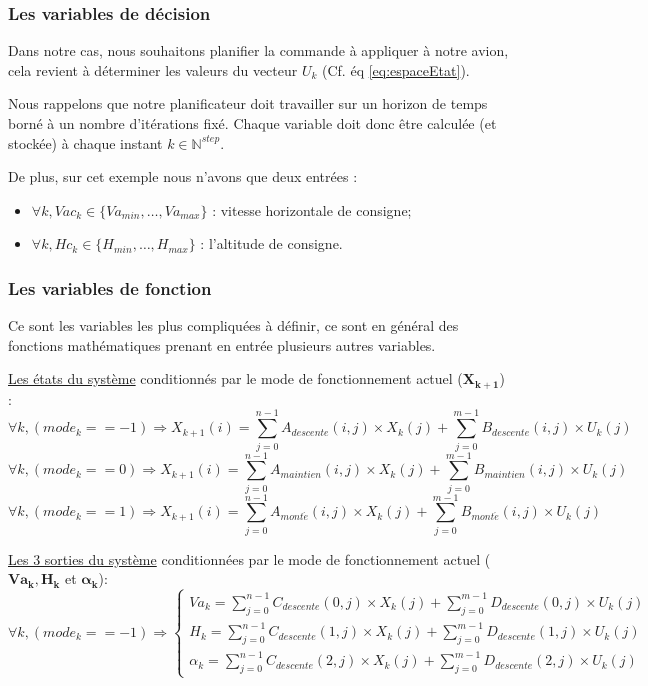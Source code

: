 \subsubsection{Les variables de décision}
\label{variableDecision}
Dans notre cas, nous souhaitons planifier la commande à appliquer à notre avion, cela revient à déterminer les valeurs du vecteur $U_k$ (Cf. éq \ref{eq:espaceEtat}). 


Nous rappelons que notre planificateur doit travailler sur un horizon de temps borné à un nombre d'itérations fixé. Chaque variable doit donc être calculée (et stockée) à chaque instant $k \in \mathbb{N}^{step}$.

De plus, sur cet exemple nous n'avons que deux entrées :
\begin{itemize}	
	\item $\forall k, Vac_{k} \in \{Va_{min}, \ldots, Va_{max}\}$ : vitesse horizontale de consigne;	
	\item $\forall k, Hc_{k} \in \{H_{min}, \ldots, H_{max}\}$ : l'altitude de consigne.	
\end{itemize}

\subsubsection{Les variables de fonction}
\label{variableFonction}
Ce sont les variables les plus compliquées à définir, ce sont en général des fonctions mathématiques prenant en entrée plusieurs autres variables.

\underline{Les états du système} conditionnés par le mode de fonctionnement actuel ({$\mathbf{X_{k+1}}$}) :\\
\[\forall k, (mode_k == -1) \Rightarrow X_{k+1}(i) = \sum_{j=0}^{n-1} A_{descente}(i,j)\times X_k(j) + \sum_{j=0}^{m-1} B_{descente}(i,j)\times U_k(j)\]
\[\forall k, (mode_k == 0) \Rightarrow X_{k+1}(i) = \sum_{j=0}^{n-1} A_{maintien}(i,j)\times X_k(j) + \sum_{j=0}^{m-1} B_{maintien}(i,j)\times U_k(j)\]
\[\forall k, (mode_k == 1) \Rightarrow X_{k+1}(i) = \sum_{j=0}^{n-1} A_{mont\acute{e}}(i,j)\times X_k(j) + \sum_{j=0}^{m-1} B_{mont\acute{e}}(i,j)\times U_k(j)\]

\underline{Les 3 sorties du système} conditionnées par le mode de fonctionnement actuel ($\mathbf{Va_k, H_k}$ et $\mathbf{\alpha_k}$):\\
\[\forall k, (mode_k == -1) \Rightarrow 
	\left \{
	\begin{array}{l}
	Va_k = \sum_{j=0}^{n-1} C_{descente}(0,j)\times X_k(j) + \sum_{j=0}^{m-1} D_{descente}(0,j)\times U_k(j) \\
	H_k = \sum_{j=0}^{n-1} C_{descente}(1,j)\times X_k(j) + \sum_{j=0}^{m-1} D_{descente}(1,j)\times U_k(j) \\
	\alpha_k = \sum_{j=0}^{n-1} C_{descente}(2,j)\times X_k(j) + \sum_{j=0}^{m-1} D_{descente}(2,j)\times U_k(j)
	\end{array}
	\right.\]
	
